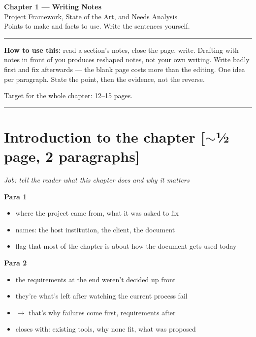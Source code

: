 \documentclass[11pt,a4paper]{article}
\newcommand{\job}[1]{\par\vspace{2pt}\noindent\textcolor{gr}{\textit{Job: #1}}\par\vspace{2pt}}
\newcommand{\len}[1]{\hfill\textcolor{gr}{\small[#1]}}
\begin{document}
\begin{center}
{\LARGE\bfseries\color{acc} Chapter 1 --- Writing Notes}\\[3pt]
{\small Project Framework, State of the Art, and Needs Analysis}\\[2pt]
{\small\color{gr} Points to make and facts to use. Write the sentences yourself.}
\end{center}

\vspace{6pt}
\hrule
\vspace{8pt}

\textbf{How to use this:} read a section's notes, close the page, write. Drafting
with notes in front of you produces reshaped notes, not your own writing. Write
badly first and fix afterwards --- the blank page costs more than the editing.
One idea per paragraph. State the point, then the evidence, not the reverse.

\vspace{4pt}
Target for the whole chapter: 12--15 pages.

\vspace{8pt}
\hrule

\section*{Introduction to the chapter \len{$\sim$½ page, 2 paragraphs}}
\job{tell the reader what this chapter does and why it matters}

\textbf{Para 1}
\begin{itemize}
\item where the project came from, what it was asked to fix
\item names: the host institution, the client, the document
\item flag that most of the chapter is about how the document gets used today
\end{itemize}

\textbf{Para 2}
\begin{itemize}
\item the requirements at the end weren't decided up front
\item they're what's left after watching the current process fail
\item $\rightarrow$ that's why failures come first, requirements after
\item closes with: existing tools, why none fit, what was proposed
\end{itemize}
\end{document}
